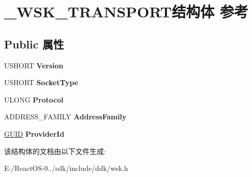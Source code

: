 \hypertarget{struct___w_s_k___t_r_a_n_s_p_o_r_t}{}\section{\+\_\+\+W\+S\+K\+\_\+\+T\+R\+A\+N\+S\+P\+O\+R\+T结构体 参考}
\label{struct___w_s_k___t_r_a_n_s_p_o_r_t}
\subsection*{Public 属性}
\begin{DoxyCompactItemize}
\item 
\mbox{\label{struct___w_s_k___t_r_a_n_s_p_o_r_t_ada346467519c6d1adfb8602a8464546e}} 
U\+S\+H\+O\+RT {\bfseries Version}
\item 
\mbox{\label{struct___w_s_k___t_r_a_n_s_p_o_r_t_a63f71ddce31378bb649a068389752c60}} 
U\+S\+H\+O\+RT {\bfseries Socket\+Type}
\item 
\mbox{\label{struct___w_s_k___t_r_a_n_s_p_o_r_t_a9e021df45c643f867fb0bc1cc122f333}} 
U\+L\+O\+NG {\bfseries Protocol}
\item 
\mbox{\label{struct___w_s_k___t_r_a_n_s_p_o_r_t_a58199f23bf9a9be3bbad4dacc6ce8b93}} 
A\+D\+D\+R\+E\+S\+S\+\_\+\+F\+A\+M\+I\+LY {\bfseries Address\+Family}
\item 
\mbox{\label{struct___w_s_k___t_r_a_n_s_p_o_r_t_a692612f842a0e893a019d91734cf2f43}} 
\hyperlink{interface_g_u_i_d}{G\+U\+ID} {\bfseries Provider\+Id}
\end{DoxyCompactItemize}


该结构体的文档由以下文件生成\+:\begin{DoxyCompactItemize}
\item 
E\+:/\+React\+O\+S-\/0../sdk/include/ddk/wsk.\+h\end{DoxyCompactItemize}
